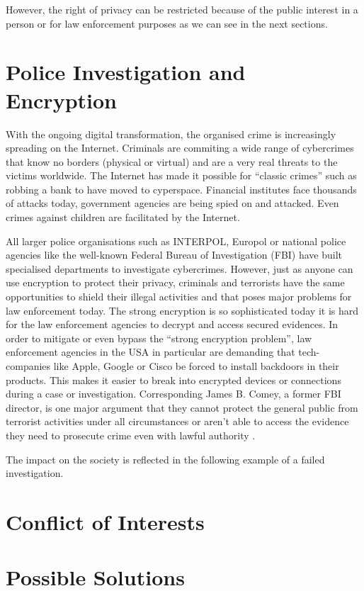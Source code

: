 \documentclass[a4paper, 11pt]{article}
\begin{document}
However, the right of privacy can be restricted because of the public interest in a person or for law enforcement purposes as we can see in the next sections.
\section*{Police Investigation and Encryption}
With the ongoing digital transformation, the organised crime is increasingly spreading on the Internet.
Criminals are commiting a wide range of cybercrimes that know no borders (physical or virtual) and are a very real threats to the victims worldwide. The Internet has made it possible for \enquote{classic crimes} such as robbing a bank to have moved to cyperspace. Financial institutes face thousands of attacks today, government agencies are being spied on and attacked. Even crimes against children are facilitated by the Internet.
\par All larger police organisations such as INTERPOL, Europol or national police agencies like the well-known Federal Bureau of Investigation (FBI) have built specialised departments to investigate cybercrimes. However, just as anyone can use encryption to protect their privacy, criminals and terrorists have the same opportunities to shield their illegal activities and that poses major problems for law enforcement today. The strong encryption is so sophisticated today it is hard for the law enforcement agencies to decrypt and access secured evidences. In order to mitigate or even bypass the \enquote{strong encryption problem}, law enforcement agencies in the USA in particular are demanding that tech-companies like Apple, Google or Cisco be forced to install backdoors in their products. This makes it easier to break into encrypted devices or connections during a case or investigation. Corresponding James B. Comey, a former FBI director, is one major argument that they cannot protect the general public from terrorist activities under all circumstances or aren't able to access the evidence they need to prosecute crime even with lawful authority \cite{COMEY}. 
\par The impact on the society is reflected in the following example of a failed investigation.

\section*{Conflict of Interests}

\section*{Possible Solutions}
\end{document}
